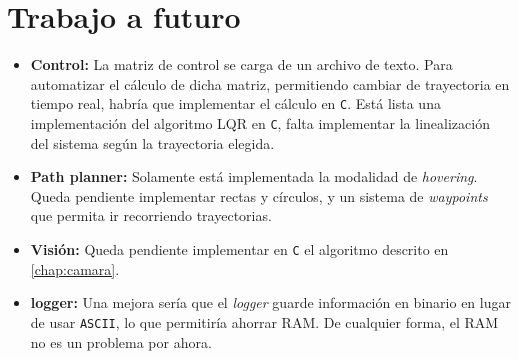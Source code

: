 \documentclass[main]{subfiles}
\begin{document}
\section{Trabajo a futuro}
\label{sec:codigo:trabajo-a-futuro}

\begin{itemize}
\item \textbf{Control:} La matriz de control se carga de un archivo de texto. Para automatizar el cálculo de dicha matriz, permitiendo cambiar de trayectoria en tiempo real, habría que implementar el cálculo en \verb+C+. Está lista una implementación del algoritmo LQR en \verb+C+, falta implementar la linealización del sistema según la trayectoria elegida.
\item \textbf{Path planner:} Solamente está implementada la modalidad de \textit{hovering}. Queda pendiente implementar rectas y círculos, y un sistema de \textit{waypoints} que permita ir recorriendo trayectorias.
\item \textbf{Visión:} Queda pendiente implementar en \verb+C+ el algoritmo descrito en \ref{chap:camara}.
\item \textbf{logger:} Una mejora sería que el \textit{logger} guarde información en binario en lugar de usar \verb+ASCII+, lo que permitiría ahorrar RAM. De cualquier forma, el RAM no es un problema por ahora.
\end{itemize}
\end{document}
